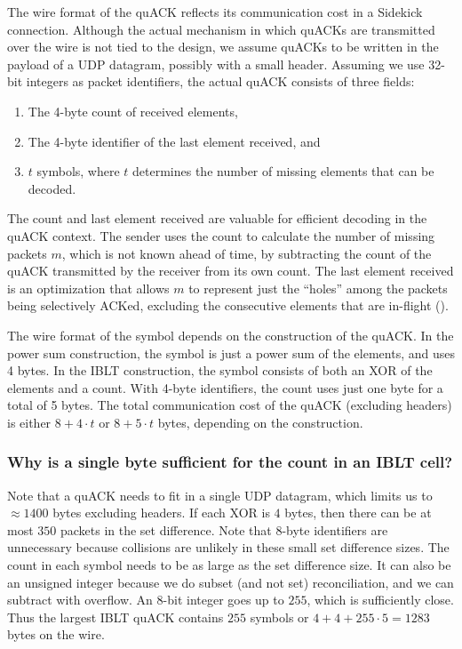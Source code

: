 The wire format of the quACK reflects its communication cost in a Sidekick
connection. Although the actual mechanism in which quACKs are transmitted over
the wire is not tied to the design, we assume quACKs to be written in the
payload of a UDP datagram, possibly with a small header. Assuming we use 32-bit
integers as packet identifiers, the actual quACK consists of three fields:

\begin{enumerate}[label=(\roman*),noitemsep]
\item The 4-byte count of received elements,
\item The 4-byte identifier of the last element received, and
\item $t$ symbols, where $t$ determines the number of missing elements that can be decoded.
\end{enumerate}

The count and last element received are valuable for efficient decoding in the
quACK context. The sender uses the count to calculate the number of missing
packets $m$, which is not known ahead of time, by subtracting the count of the
quACK transmitted by the receiver from its own count. The last element received
is an optimization that allows $m$ to represent just the ``holes'' among the
packets being selectively ACKed, excluding the consecutive elements that are
in-flight ().

The wire format of the symbol depends on the construction of the quACK. In the
power sum construction, the symbol is just a power sum of the elements, and
uses 4 bytes. In the IBLT construction, the symbol consists of both an XOR of
the elements and a count. With 4-byte identifiers, the count uses just one byte
for a total of 5 bytes. The total communication cost of the quACK (excluding
headers) is either $8+4\cdot t$ or $8+5\cdot t$ bytes, depending on the
construction.

\subsubsection{Why is a single byte sufficient for the count in an IBLT cell?}

Note that a quACK needs to fit in a single UDP datagram, which limits us to
$\approx\!1400$ bytes excluding headers. If each XOR is $4$ bytes, then there
can be at most $350$ packets in the set difference. Note that $8$-byte
identifiers are unnecessary because collisions are unlikely in these small set
difference sizes. The count in each symbol needs to be as large as the set
difference size. It can also be an unsigned integer because we do subset
(and not set) reconciliation, and we can subtract with overflow. An 8-bit
integer goes up to $255$, which is sufficiently close. Thus the largest IBLT
quACK contains $255$ symbols or $4 + 4 + 255 \cdot 5 = 1283$ bytes on the wire.

